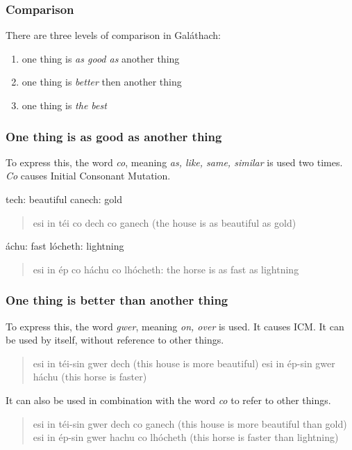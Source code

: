 \subsubsection{Comparison}

There are three levels of comparison in Gal\'{a}thach:
\begin{enumerate}
\item one thing is \textit{as good as} another thing
\item one thing is \textit{better} then another thing
\item one thing is \textit{the best}
\end{enumerate}

\subsubsection{One thing is as good as another thing}

To express this, the word \textit{co}, meaning \textit{as, like, same, similar} is used two times. \textit{Co} causes Initial Consonant Mutation.

tech: beautiful
canech: gold
\begin{quote}
esi in t\'{e}i co dech co ganech (the house is as beautiful as gold)
\end{quote}

\'{a}chu: fast
l\'{o}cheth: lightning
\begin{quote}
esi in \'{e}p co h\'{a}chu co lh\'{o}cheth: the horse is as fast as lightning
\end{quote}

\subsubsection{One thing is better than another thing}

To express this, the word \textit{gwer}, meaning \textit{on, over} is used. It causes ICM. It can be used by itself, without reference to other things.

\begin{quote}
esi in t\'{e}i-sin gwer dech (this house is more beautiful)
esi in \'{e}p-sin gwer h\'{a}chu (this horse is faster)
\end{quote}

It can also be used in combination with the word \textit{co} to refer to other things.

\begin{quote}
esi in t\'{e}i-sin gwer dech co ganech (this house is more beautiful than gold)
esi in \'{e}p-sin gwer hachu co lh\'{o}cheth (this horse is faster than lightning)
\end{quote}

